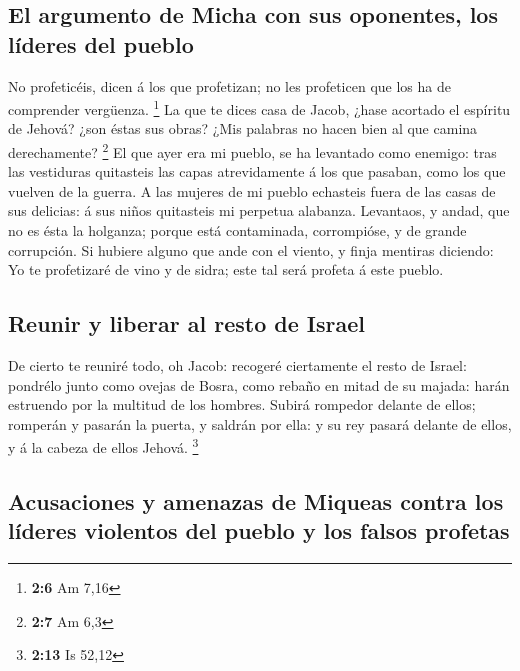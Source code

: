 \hypertarget{el-argumento-de-micha-con-sus-oponentes-los-luxedderes-del-pueblo}{%
\subsection{El argumento de Micha con sus oponentes, los líderes del
pueblo}\label{el-argumento-de-micha-con-sus-oponentes-los-luxedderes-del-pueblo}}

 No profeticéis, dicen á los que profetizan; no les
profeticen que los ha de comprender vergüenza. \footnote{\textbf{2:6} Am
  7,16}  La que te dices casa de Jacob, ¿hase acortado el
espíritu de Jehová? ¿son éstas sus obras? ¿Mis palabras no hacen bien al
que camina derechamente? \footnote{\textbf{2:7} Am 6,3} 
El que ayer era mi pueblo, se ha levantado como enemigo: tras las
vestiduras quitasteis las capas atrevidamente á los que pasaban, como
los que vuelven de la guerra.  A las mujeres de mi pueblo
echasteis fuera de las casas de sus delicias: á sus niños quitasteis mi
perpetua alabanza.  Levantaos, y andad, que no es ésta la
holganza; porque está contaminada, corrompióse, y de grande corrupción.
 Si hubiere alguno que ande con el viento, y finja
mentiras diciendo: Yo te profetizaré de vino y de sidra; este tal será
profeta á este pueblo.

\hypertarget{reunir-y-liberar-al-resto-de-israel}{%
\subsection{Reunir y liberar al resto de
Israel}\label{reunir-y-liberar-al-resto-de-israel}}

 De cierto te reuniré todo, oh Jacob: recogeré
ciertamente el resto de Israel: pondrélo junto como ovejas de Bosra,
como rebaño en mitad de su majada: harán estruendo por la multitud de
los hombres.  Subirá rompedor delante de ellos; romperán
y pasarán la puerta, y saldrán por ella: y su rey pasará delante de
ellos, y á la cabeza de ellos Jehová. \footnote{\textbf{2:13} Is 52,12}

\hypertarget{acusaciones-y-amenazas-de-miqueas-contra-los-luxedderes-violentos-del-pueblo-y-los-falsos-profetas}{%
\subsection{Acusaciones y amenazas de Miqueas contra los líderes
violentos del pueblo y los falsos
profetas}\label{acusaciones-y-amenazas-de-miqueas-contra-los-luxedderes-violentos-del-pueblo-y-los-falsos-profetas}}

